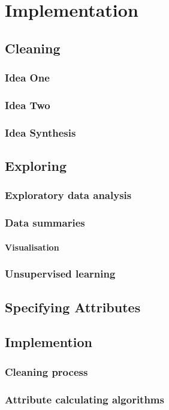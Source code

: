 \chapter{Implementation}
\section{Cleaning}
		\subsection{Idea One}
		\subsection{Idea Two}
		\subsection{Idea Synthesis}
\section{Exploring}
	\subsection{Exploratory data analysis}
		\subsection{Data summaries}
		\subsubsection{Visualisation}
	\subsection{Unsupervised learning}
\section{Specifying Attributes}
\section{Implemention}
	\subsection{Cleaning process}
	\subsection{Attribute calculating algorithms}